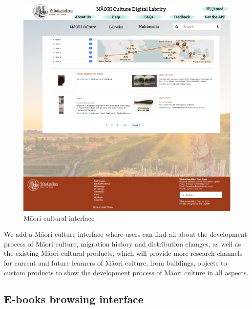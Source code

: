 \begin{figure}[htbp]
  \centerline{\includegraphics[width=400pt]{images/3-1-3.png}}
  \caption{Māori cultural interface}
  \label{fig30}
\end{figure}

We add a Māori culture interface where users can find all about the development process of Māori culture, migration history and distribution changes, as well as the existing Māori cultural products, which will provide more research channels for current and future learners of Māori culture, from buildings, objects to custom products to show the development process of Māori culture in all aspects.

\subsection{E-books browsing interface}

